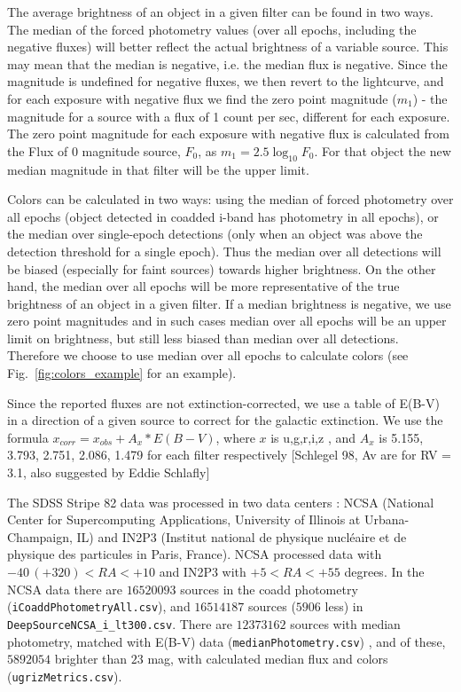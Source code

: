 \documentclass[fleqn,usenatbib]{mnras}  %
\begin{document}
The average brightness of an object in  a given filter can be found in two ways. The median of the forced photometry values (over all epochs, including the negative fluxes)   will better reflect the actual brightness of a variable source. This may mean that the median is negative, i.e. the median flux is negative. Since the magnitude is undefined for negative fluxes, we then revert to the lightcurve, and for each exposure with negative flux we find the zero point magnitude ($m_1$) - the magnitude for a source with a flux of 1 count per sec, different for each exposure.  The zero point magnitude for each exposure with negative flux is calculated from the  Flux of 0 magnitude source,  $F_0$,  as  $m_{1} = 2.5 \log_{10}{F_{0}}$. For that object the new median magnitude in that filter will be the upper limit. 

Colors can be calculated in two ways: using the median of forced photometry over all epochs (object detected in coadded i-band has photometry in all epochs), or the median over single-epoch detections (only when an object was above the detection threshold for a single epoch).  
Thus the median over all detections will be biased (especially for faint sources) towards higher brightness.  On the other hand, the median over all epochs will be more representative of the true brightness of an object in a given filter.  If a median brightness is negative, we use zero point magnitudes and in such cases median over all epochs will be an upper limit on brightness, but still less biased than median over all detections. Therefore  we choose to use median over all epochs to calculate colors (see Fig.~\ref{fig:colors_example} for an example).  

Since the reported fluxes are not extinction-corrected, we use a table of E(B-V) in a direction of a given source to correct for the galactic extinction. We use the formula  $x_{corr}  = x_{obs} + A_{x} * E(B-V)$, where $x$ is  u,g,r,i,z , and $A_x$ is 5.155, 3.793, 2.751, 2.086, 1.479  for each filter respectively  [Schlegel 98, Av are for RV = 3.1, also suggested by Eddie Schlafly] 

The SDSS Stripe 82 data was processed in two data centers : NCSA (National Center for Supercomputing Applications, University of Illinois at Urbana-Champaign, IL) and IN2P3  (Institut national de physique nucl\'eaire et de physique des particules in Paris, France). NCSA processed data  with  $-40 \, (+320) < RA < +10 $ and IN2P3 with $ +5 < RA < +55$ degrees. In the NCSA data  there are $16520093$ sources in the coadd photometry (\verb|iCoaddPhotometryAll.csv|), and $16514187$ sources ($5906$ less) in \verb|DeepSourceNCSA_i_lt300.csv|. There are $12373162$ sources with median photometry, matched with E(B-V) data (\verb|medianPhotometry.csv|) , and  of these, $5892054$ brighter than $23$ mag, with calculated median flux and colors (\verb|ugrizMetrics.csv|). 
\end{document}

